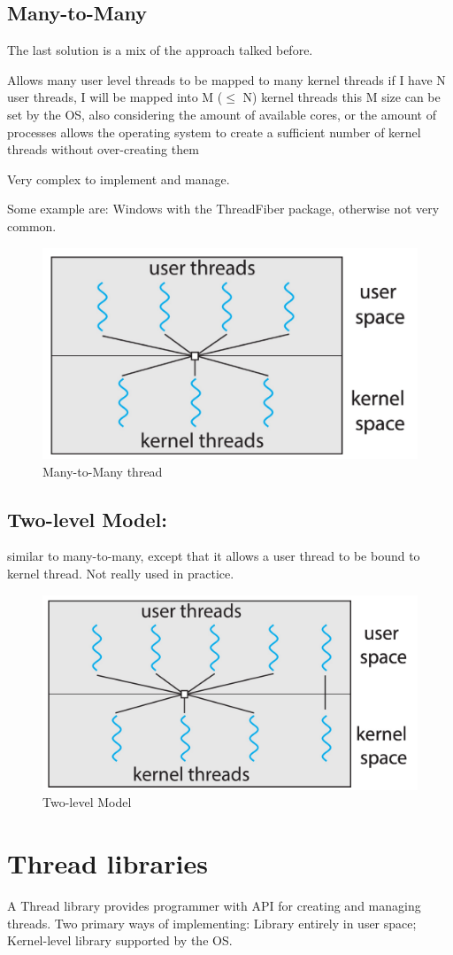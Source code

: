 \subsection{Many-to-Many}
The last solution is a mix of the approach talked before.

Allows many user level threads to be mapped to many kernel threads if I have N user threads, I will be mapped into M ($\leq$ N) kernel threads this M size can be set by the OS, also considering the amount of
available cores, or the amount of processes allows the operating system to create a sufficient number of kernel
threads without over-creating them

Very complex to implement and manage.

Some example are: Windows with the ThreadFiber package, otherwise not very common.

\begin{figure}[htbp]
    \centering
    \includegraphics[width=0.5\linewidth]{img/MtMM.png}
    \caption{Many-to-Many thread}        
\end{figure}

\newpage
\subsection{Two-level Model: } similar to many-to-many, except that it allows a user thread to be bound to kernel thread. Not really used in practice.

\begin{figure}[htbp]
    \centering
    \includegraphics[width=0.5\linewidth]{img/TlT.png}
    \caption{Two-level Model}
    
\end{figure}

\newpage
\section{Thread libraries}
A Thread library provides programmer with API for creating and managing threads. Two primary ways of implementing: Library entirely in user space; Kernel-level library supported by the OS.

